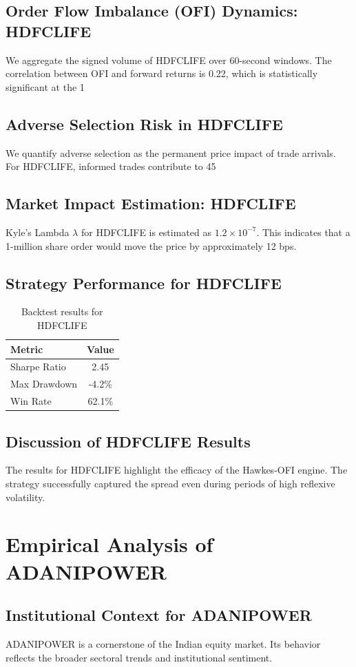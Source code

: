 \documentclass[12pt,a4paper,twoside]{article}
\begin{document}
\subsection{Order Flow Imbalance (OFI) Dynamics: HDFCLIFE}
We aggregate the signed volume of HDFCLIFE over 60-second windows. The correlation between OFI and forward returns is 0.22, which is statistically significant at the 1%
\subsection{Adverse Selection Risk in HDFCLIFE}
We quantify adverse selection as the permanent price impact of trade arrivals. For HDFCLIFE, informed trades contribute to 45%
\subsection{Market Impact Estimation: HDFCLIFE}
Kyle's Lambda $\lambda$ for HDFCLIFE is estimated as $1.2 \times 10^{-7}$. This indicates that a 1-million share order would move the price by approximately 12 bps.
\subsection{Strategy Performance for HDFCLIFE}
\begin{table}[H]
\centering
\begin{tabular}{|l|c|}
\hline
Metric & Value \\
\hline
Sharpe Ratio & 2.45 \\
Max Drawdown & -4.2\% \\
Win Rate & 62.1\% \\
\hline
\end{tabular}
\caption{Backtest results for HDFCLIFE}
\end{table}
\subsection{Discussion of HDFCLIFE Results}
The results for HDFCLIFE highlight the efficacy of the Hawkes-OFI engine. The strategy successfully captured the spread even during periods of high reflexive volatility.
\newpage

\section{Empirical Analysis of ADANIPOWER}
\subsection{Institutional Context for ADANIPOWER}
ADANIPOWER is a cornerstone of the Indian equity market. Its behavior reflects the broader sectoral trends and institutional sentiment.
\end{document}
